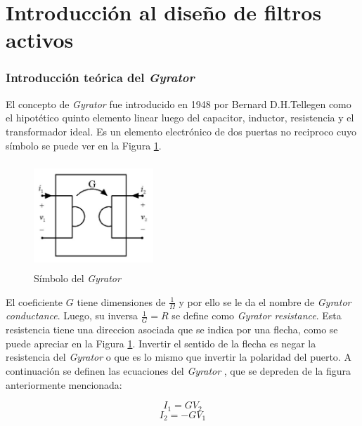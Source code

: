 

\part{Introducción al diseño de filtros activos}
\section{Introducción teórica del \textit{Gyrator}}
El concepto de \textit{Gyrator} fue introducido en 1948 por Bernard D.H.Tellegen como el hipotético quinto elemento linear luego del capacitor, inductor, resistencia y
el transformador ideal. Es un elemento electrónico de dos puertas no reciproco cuyo símbolo se puede ver en la Figura \ref{ej2_gyrator_symbol}.

\begin{figure}[h!]                                                       
    \centering\includegraphics[width=0.4\textwidth, height=4cm]{../Ex2/Resources/ej2_gyrator_symbol.png}
    \caption{Símbolo del \textit{Gyrator}}
    \label{ej2_gyrator_symbol}
    \end{figure}

El coeficiente $G$ tiene dimensiones de $\frac{1}{\Omega}$ y por ello se le da el nombre de \textit{Gyrator conductance}. Luego, su inversa $\frac{1}{G} = R$ se define como \textit{Gyrator resistance}. Esta resistencia tiene una direccion asociada que 
se indica por una flecha, como se puede apreciar en la Figura \ref{ej2_gyrator_symbol}. Invertir el sentido de la flecha es negar la resistencia del \textit{Gyrator} o que es lo mismo que invertir
la polaridad del puerto. A continuación se definen las ecuaciones del \textit{Gyrator} , que se depreden de la figura anteriormente mencionada:

\begin{equation} I_{1} = G V_2 \label{ej2_ecua_gyrator_1}\end{equation}
\begin{equation} I_{2} =  -G V_1 \label{ej2_ecua_gyrator_2}\end{equation}


